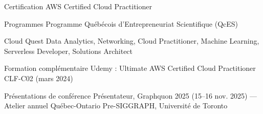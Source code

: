 
\begin{cvskills}
\cvskill
{Certification}
{AWS Certified Cloud Practitioner}

\cvskill
{Programmes}
{Programme Québécois d'Entrepreneuriat Scientifique (QcES)}

\cvskill
{Cloud Quest}
{Data Analytics, Networking, Cloud Practitioner, Machine Learning, Serverless Developer, Solutions Architect}

\cvskill
{Formation complémentaire}
{Udemy : Ultimate AWS Certified Cloud Practitioner CLF-C02 (mars 2024)}

\cvskill
{Présentations de conférence}
{Présentateur, Graphquon 2025 (15--16 nov. 2025) --- Atelier annuel Québec-Ontario Pre-SIGGRAPH, Université de Toronto}
\end{cvskills}
